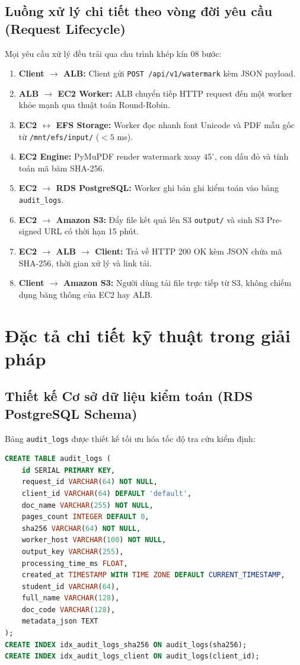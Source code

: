 \documentclass[12pt,a4paper]{report}
\begin{document}
\subsection{Luồng xử lý chi tiết theo vòng đời yêu cầu (Request Lifecycle)}
Mọi yêu cầu xử lý đều trải qua chu trình khép kín 08 bước:
\begin{enumerate}
    \item \textbf{Client $\to$ ALB:} Client gửi \texttt{POST /api/v1/watermark} kèm JSON payload.
    \item \textbf{ALB $\to$ EC2 Worker:} ALB chuyển tiếp HTTP request đến một worker khỏe mạnh qua thuật toán Round-Robin.
    \item \textbf{EC2 $\leftrightarrow$ EFS Storage:} Worker đọc nhanh font Unicode và PDF mẫu gốc từ \texttt{/mnt/efs/input/} ($< 5$ ms).
    \item \textbf{EC2 Engine:} PyMuPDF render watermark xoay $45^\circ$, con dấu đỏ và tính toán mã băm SHA-256.
    \item \textbf{EC2 $\to$ RDS PostgreSQL:} Worker ghi bản ghi kiểm toán vào bảng \texttt{audit\_logs}.
    \item \textbf{EC2 $\to$ Amazon S3:} Đẩy file kết quả lên S3 \texttt{output/} và sinh S3 Pre-signed URL có thời hạn 15 phút.
    \item \textbf{EC2 $\to$ ALB $\to$ Client:} Trả về HTTP 200 OK kèm JSON chứa mã SHA-256, thời gian xử lý và link tải.
    \item \textbf{Client $\to$ Amazon S3:} Người dùng tải file trực tiếp từ S3, không chiếm dụng băng thông của EC2 hay ALB.
\end{enumerate}

\section{Đặc tả chi tiết kỹ thuật trong giải pháp}

\subsection{Thiết kế Cơ sở dữ liệu kiểm toán (RDS PostgreSQL Schema)}
Bảng \texttt{audit\_logs} được thiết kế tối ưu hóa tốc độ tra cứu kiểm định:
\begin{lstlisting}[language=SQL]
CREATE TABLE audit_logs (
    id SERIAL PRIMARY KEY,
    request_id VARCHAR(64) NOT NULL,
    client_id VARCHAR(64) DEFAULT 'default',
    doc_name VARCHAR(255) NOT NULL,
    pages_count INTEGER DEFAULT 0,
    sha256 VARCHAR(64) NOT NULL,
    worker_host VARCHAR(100) NOT NULL,
    output_key VARCHAR(255),
    processing_time_ms FLOAT,
    created_at TIMESTAMP WITH TIME ZONE DEFAULT CURRENT_TIMESTAMP,
    student_id VARCHAR(64),
    full_name VARCHAR(128),
    doc_code VARCHAR(128),
    metadata_json TEXT
);
CREATE INDEX idx_audit_logs_sha256 ON audit_logs(sha256);
CREATE INDEX idx_audit_logs_client ON audit_logs(client_id);
\end{lstlisting}
\end{document}

